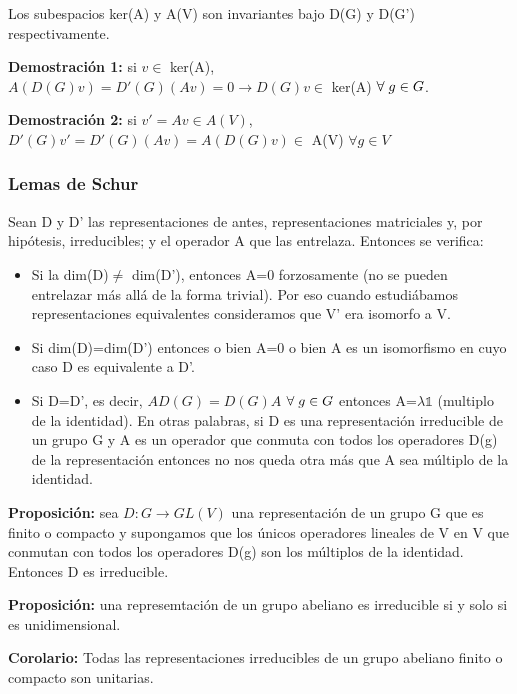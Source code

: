 \documentclass{article}
\begin{document}
Los subespacios ker(A) y A(V) son invariantes bajo D(G) y D(G') respectivamente.

\smallskip
\textbf{Demostración 1:} si $v\in$ ker(A), $A(D(G)v)=D'(G)(Av)=0\longrightarrow D(G)v\in$ ker(A) $\forall  \hspace{0.1cm} g\in G$.

\smallskip
\textbf{Demostración 2:} si $v'=Av\in A(V)$, $D'(G)v'=D'(G)(Av)=A(D(G)v)\in$ A(V) $\forall g\in V$

\subsubsection{Lemas de Schur}

Sean D y D' las representaciones de antes, representaciones matriciales y, por hipótesis, irreducibles; y el operador A que las entrelaza. Entonces se verifica:

\begin{itemize}
\item Si la dim(D)$\neq$ dim(D'), entonces A=0 forzosamente (no se pueden entrelazar más allá de la forma trivial). Por eso cuando estudiábamos representaciones equivalentes consideramos que V' era isomorfo a V.

\item Si dim(D)=dim(D') entonces o bien A=0 o bien A es un isomorfismo en cuyo caso D es equivalente a D'.
\item Si D=D', es decir, $AD(G)=D(G)A$ $\forall  \hspace{0.1cm} g\in G$ entonces A=$\lambda \mathds{1}$ (multiplo de la identidad). En otras palabras, si D es una representación irreducible de un grupo G y A es un operador que conmuta con todos los operadores D(g) de la representación entonces no nos queda otra más que A sea múltiplo de la identidad.
\end{itemize}

\smallskip

\textbf{Proposición:} sea $D: G\to GL(V)$ una representación de un grupo G que es finito o compacto y supongamos que los únicos operadores lineales de V en V que conmutan con todos los operadores D(g) son los múltiplos de la identidad. Entonces D es irreducible.

\smallskip
\textbf{Proposición:} una represemtación de un grupo abeliano es irreducible si y solo si es unidimensional.

\smallskip
\textbf{Corolario:} Todas las representaciones irreducibles de un grupo abeliano finito o compacto son unitarias.
\end{document}
